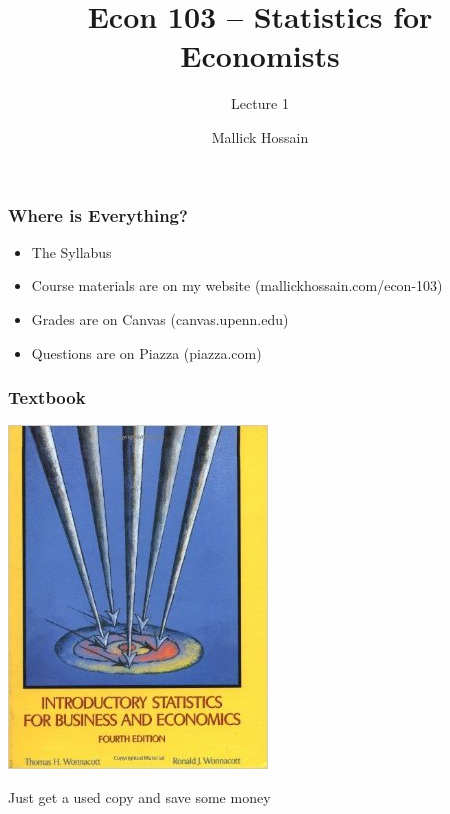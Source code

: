 \documentclass[handout]{beamer}
\title{Econ 103 -- Statistics for Economists}
\subtitle{Lecture 1}
\author{Mallick Hossain}
\institute{University of Pennsylvania}
\begin{document}
 

\begin{frame}
	\titlepage 
\end{frame} 

\begin{frame}
\frametitle{Where is Everything?}
	\begin{itemize}[<+- | alert@+>]
		\item  The Syllabus
		\item Course materials are on my website (mallickhossain.com/econ-103)
		\item Grades are on Canvas (canvas.upenn.edu)
		\item Questions are on Piazza (piazza.com)
	\end{itemize}
\end{frame}

\begin{frame}
\frametitle{Textbook}
	\begin{center}
		\includegraphics[scale=0.5]{./images/textbook.jpeg}
	\end{center}
	\centering
	Just get a used copy and save some money
\end{frame}
\end{document}
